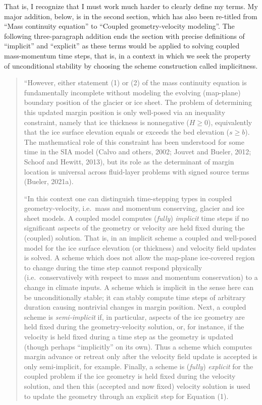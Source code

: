 \documentclass[letterpaper,final,12pt,reqno]{amsart}
\begin{document}
That is, I recognize that I must work much harder to clearly define my terms.  My major addition, below, is in the second section, which has also been re-titled from ``Mass continuity equation'' to ``Coupled geometry-velocity modeling''.  The following three-paragraph addition ends the section with precise definitions of ``implicit'' and ``explicit'' as these terms would be applied to solving coupled mass-momentum time steps, that is, in a context in which we seek the property of unconditional stability by choosing the scheme construction called implicitness.

\begin{quote}
``However, either statement (1) or (2) of the mass continuity equation is fundamentally incomplete without modeling the evolving (map-plane) boundary position of the glacier or ice sheet.  The problem of determining this updated margin position is only well-posed via an inequality constraint, namely that ice thickness is nonnegative ($H\ge 0$), equivalently that the ice surface elevation equals or exceeds the bed elevation ($s \ge b$).  The mathematical role of this constraint has been understood for some time in the SIA model (Calvo and others, 2002; Jouvet and Bueler, 2012; Schoof and Hewitt, 2013), but its role as the determinant of margin location is universal across fluid-layer problems with signed source terms (Bueler, 2021a).

``In this context one can distinguish time-stepping types in coupled geometry-velocity, i.e.~mass and momentum conserving, glacier and ice sheet models.  A coupled model computes (\emph{fully}) \emph{implicit} time steps if no significant aspects of the geometry or velocity are held fixed during the (coupled) solution.  That is, in an implicit scheme a coupled and well-posed model for the ice surface elevation (or thickness) and velocity field updates is solved.  A scheme which does not allow the map-plane ice-covered region to change during the time step cannot respond physically (i.e.~conservatively with respect to mass and momentum conservation) to a change in climate inputs.  A scheme which is implicit in the sense here can be unconditionally stable; it can stably compute time steps of arbitrary duration causing nontrivial changes in margin position.  Next, a coupled scheme is \emph{semi-implicit} if, in particular, aspects of the ice geometry are held fixed during the geometry-velocity solution, or, for instance, if the velocity is held fixed during a time step as the geometry is updated (though perhaps ``implicitly'' on its own).  Thus a scheme which computes margin advance or retreat only after the velocity field update is accepted is only semi-implicit, for example.  Finally, a scheme is (\emph{fully}) \emph{explicit} for the coupled problem if the ice geometry is held fixed during the velocity solution, and then this (accepted and now fixed) velocity solution is used to update the geometry through an explicit step for Equation (1).


\end{quote}
\end{document}
